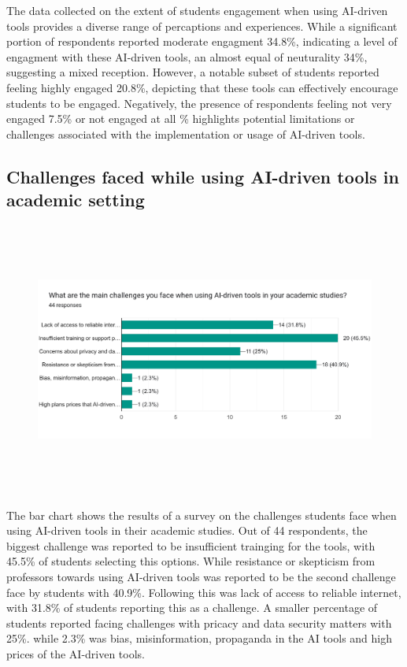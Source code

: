 The data collected on the extent of students engagement when using AI-driven tools
provides a diverse range of percaptions and experiences. While a significant portion
of respondents reported moderate engagment 34.8\%, indicating a level of engagment with
these AI-driven tools, an almost equal of neuturality 34\%, suggesting a mixed reception.
However, a notable subset of students reported feeling highly engaged 20.8\%, depicting that
these tools can effectively encourage students to be engaged. Negatively, the presence
of respondents feeling not very engaged 7.5\% or not engaged at all \% highlights potential
limitations or challenges associated with the implementation or usage of AI-driven tools.


\subsection{Challenges faced while using AI-driven tools in academic setting}

\begin{figure}[H]
	\centering
	\includegraphics[width=17cm, height=9cm]{./chap4/figures/chall}
\end{figure}

The bar chart shows the results of a survey on the challenges students
face when using AI-driven tools in their academic studies. Out of 44 respondents,
the biggest challenge was reported to be insufficient trainging for the
tools, with 45.5\% of students selecting this options. While resistance or skepticism
from professors towards using AI-driven tools was reported to be the second challenge
face by students with 40.9\%.
Following this was lack of access to reliable internet, with 31.8\% of students
reporting this as a challenge.
A smaller percentage of students reported facing challenges with pricacy and data security matters
with 25\%. while 2.3\% was bias, misinformation, propaganda in the AI tools and high prices of the AI-driven tools.

